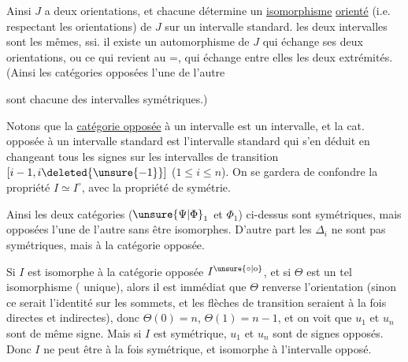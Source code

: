 Ainsi $J$ a deux orientations, et  chacune détermine un \uline{isomorphisme} \uline{orienté} (i.e. respectant les orientations) de $J$ sur un intervalle standard.  les deux intervalles sont les mêmes, ssi. il existe un automorphisme de $J$  qui échange ses deux orientations, ou ce qui revient au $\mathord{=}$, qui échange entre elles les deux extrémités. (Ainsi les catégories opposées l'une de l'autre

\diagram{\begin{tikzcd}[ampersand replacement=\&,column sep=small,row sep=small]
 \& \cdot\arrow[dl]\arrow[dr] \& \& \& \cdot \& \\
 \cdot \& \& \cdot \& \cdot\arrow[ur] \& \& \cdot\arrow[ul] \& {,}
\end{tikzcd}}

sont chacune des intervalles symétriques.) 

Notons que la \uline{catégorie opposée} à un intervalle est un intervalle,  et la cat. opposée à un intervalle standard  est  l'intervalle standard qui s'en déduit en changeant tous les signes sur les intervalles de transition $[i-1,i\deleted{\unsure{-1}}]$ ($1\leq i\leq n$). On se gardera de confondre la propriété $I\simeq I^{\circ}$, avec la propriété de symétrie.



Ainsi les deux catégories ($\unsure{\Psi|\Phi}_1$ et $\Phi_1$) ci-dessus sont symétriques, mais opposées l'une de l'autre sans être isomorphes. D'autre part \deleted{$\mathbb{\Delta}$} les $\mathbb{\Delta}_i$ ne sont pas symétriques, mais   à la catégorie opposée.

Si $I$ est isomorphe à la catégorie opposée $I^{\unsure{\circ|\mathrm{o}}}$, et si $\Theta$ est un tel isomorphisme ( unique), alors   il est immédiat que $\Theta$ renverse l'orientation (sinon ce serait l'identité sur les sommets, et les flèches de transition seraient à la fois directes et indirectes),  donc $\Theta(0)=n$, $\Theta(1)=n-1$, et on voit que $u_1$ et $u_n$ sont de même signe. Mais si $I$ est symétrique, $u_1$ et $u_n$ sont de signes opposés. Donc $I$ ne peut être à la fois symétrique, et isomorphe à  l'intervalle opposé.

